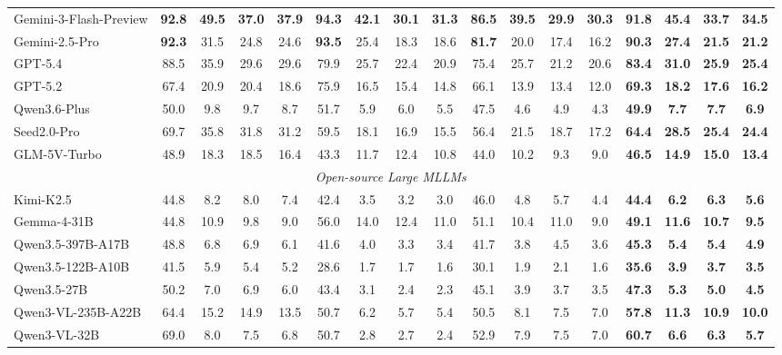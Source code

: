 \documentclass{llmxive}
\providecommand{\highlightgreen}[1]{\colorbox[HTML]{d3ff9f}{\textbf{#1}}}
\providecommand{\highlightblue}[1]{\colorbox[HTML]{bae6fb}{\textbf{#1}}}
\begin{document}
{{{\begin{table}[htbp]
\begin{tabular}{@{}l cccc cccc cccc >{\bfseries}c>{\bfseries}c>{\bfseries}c>{\bfseries}c@{}}
Gemini-3-Flash-Preview &\highlightblue{92.8}&\highlightgreen{49.5}&\highlightgreen{37.0}&\highlightgreen{37.9}&\highlightblue{94.3}&\highlightgreen{42.1}&\highlightgreen{30.1}&\highlightgreen{31.3}&\highlightblue{86.5}&\highlightgreen{39.5}&\highlightgreen{29.9}&\highlightgreen{30.3}&\highlightblue{91.8}&\highlightgreen{45.4}&\highlightgreen{33.7}&\highlightgreen{34.5} \\

Gemini-2.5-Pro &\highlightgreen{92.3}&31.5&24.8&24.6&\highlightgreen{93.5}&25.4&18.3&18.6&\highlightgreen{81.7}&20.0&17.4&16.2&\highlightgreen{90.3}&27.4&21.5&21.2\\

GPT-5.4&88.5&35.9&29.6&29.6&79.9&25.7&22.4&20.9&75.4&25.7&21.2&20.6&83.4&31.0&25.9&25.4\\

GPT-5.2 &67.4&20.9&20.4&18.6&75.9&16.5&15.4&14.8&66.1&13.9&13.4&12.0&69.3&18.2&17.6&16.2\\

Qwen3.6-Plus&50.0&9.8&9.7&8.7&51.7&5.9&6.0&5.5&47.5&4.6&4.9&4.3&49.9&7.7&7.7&6.9\\

Seed2.0-Pro&69.7&35.8&31.8&31.2&59.5&18.1&16.9&15.5&56.4&21.5&18.7&17.2&64.4&28.5&25.4&24.4\\

GLM-5V-Turbo&48.9&18.3&18.5&16.4&43.3&11.7&12.4&10.8&44.0&10.2&9.3&9.0&46.5&14.9&15.0&13.4 \\
\midrule

\multicolumn{17}{c}{\textit{Open-source Large MLLMs}} \\ \midrule
Kimi-K2.5 &44.8&8.2&8.0&7.4&42.4&3.5&3.2&3.0&46.0&4.8&5.7&4.4&44.4&6.2&6.3&5.6 \\
Gemma-4-31B &44.8&10.9&9.8&9.0&56.0&14.0&12.4&11.0&51.1&10.4&11.0&9.0&49.1&11.6&10.7&9.5\\
Qwen3.5-397B-A17B&48.8&6.8&6.9&6.1&41.6&4.0&3.3&3.4&41.7&3.8&4.5&3.6&45.3&5.4&5.4&4.9\\
Qwen3.5-122B-A10B&41.5&5.9&5.4&5.2&28.6&1.7&1.7&1.6&30.1&1.9&2.1&1.6&35.6&3.9&3.7&3.5 \\
Qwen3.5-27B &50.2&7.0&6.9&6.0&43.4&3.1&2.4&2.3&45.1&3.9&3.7&3.5&47.3&5.3&5.0&4.5 \\
Qwen3-VL-235B-A22B &64.4&15.2&14.9&13.5&50.7&6.2&5.7&5.4&50.5&8.1&7.5&7.0&57.8&11.3&10.9&10.0\\
Qwen3-VL-32B&69.0&8.0&7.5&6.8&50.7&2.8&2.7&2.4&52.9&7.9&7.5&7.0&60.7&6.6&6.3&5.7\\
\midrule


\end{tabular}
\end{table}}}}
\end{document}
